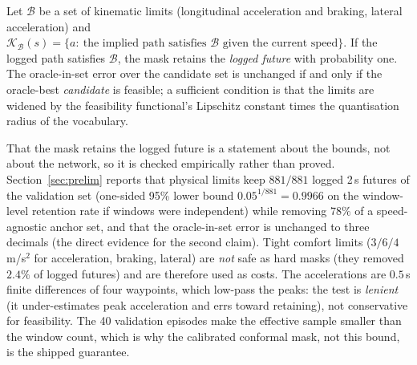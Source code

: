 \begin{proposition}\label{prop:mask}
Let $\mathcal B$ be a set of kinematic limits (longitudinal acceleration and braking, lateral acceleration) and
$\mathcal K_{\mathcal B}(s)=\{a:\ \text{the implied path satisfies }\mathcal B\text{ given the current speed}\}$. If the logged
path satisfies $\mathcal B$, the mask retains the \emph{logged future} with probability one. The oracle-in-set error over the candidate set is unchanged if and only if the oracle-best \emph{candidate} is feasible; a sufficient condition is that the limits are widened by the feasibility functional's Lipschitz constant times the quantisation radius of the vocabulary.
\end{proposition}
\noindent That the mask retains the logged future is a statement about the bounds, not about the network, so it is checked empirically rather than proved.
Section~\ref{sec:prelim} reports that physical limits keep $881/881$ logged 2\,s futures of the validation set
(one-sided 95\% lower bound $0.05^{1/881}=0.9966$ on the window-level retention rate if windows were independent) while removing
$78\%$ of a speed-agnostic anchor set, and that the oracle-in-set error is unchanged to three decimals (the direct evidence for the second claim). Tight comfort limits ($3/6/4$\,m/s$^2$ for acceleration, braking, lateral) are \emph{not} safe as hard masks
(they removed $2.4\%$ of logged futures) and are therefore used as costs. The accelerations are $0.5$\,s finite differences of four waypoints, which low-pass the peaks: the test is \emph{lenient} (it under-estimates peak acceleration and errs toward retaining), not conservative for feasibility.
The 40 validation episodes make the effective sample smaller than the window count, which is why the calibrated conformal mask, not this bound, is the shipped guarantee.

